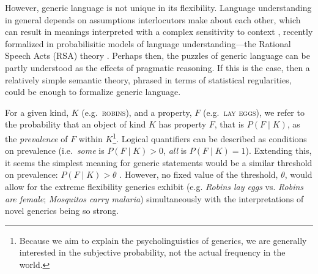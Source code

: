 \documentclass[10pt,letterpaper]{article}
\begin{document}
However, generic language is not unique in its flexibility.
Language understanding in general depends on assumptions interlocutors make about each other, which can result in meanings interpreted with a complex sensitivity to context \cite{Clark1996, Grice1975, Levinson2000}, recently formalized in probabilisitic models of language understanding---the Rational Speech Acts (RSA) theory \cite{Frank2012, Goodman2013, Franke2009}. 
Perhaps then, the puzzles of generic language can be partly understood as the effects of pragmatic reasoning.
If this is the case, then a relatively simple semantic theory, phrased in terms of statistical regularities, could be enough to formalize generic language.



For a given kind, $K$ (e.g.~\textsc{robins}), and a property, $F$ (e.g.~\textsc{lay eggs}), we refer to the probability that an object of kind $K$ has property $F$, that is $P(F\mid K)$, as the \emph{prevalence} of $F$ within $K$\footnote{Because we aim to explain the psycholinguistics of generics, we are generally interested in the subjective probability, not the actual frequency in the world.}.
Logical quantifiers can be described as conditions on prevalence (i.e.~\emph{some} is $P(F\mid K)>0$, \emph{all} is $P(F\mid K)=1$). 
Extending this, it seems the simplest meaning for generic statements would be a similar threshold on prevalence: $P(F\mid K)>\theta$ \cite{Cohen1999}. 
However, no fixed value of the threshold, $\theta$, would allow for the extreme flexibility generics exhibit (e.g. \emph{Robins lay eggs} vs. \emph{Robins are female}; \emph{Mosquitos carry malaria}) simultaneously with the interpretations of novel generics being so strong. 
\end{document}

